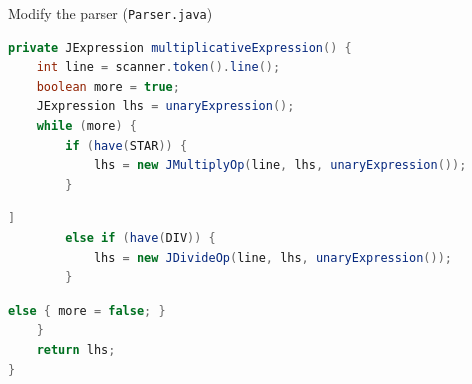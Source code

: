 \documentclass[8pt,a4paper,compress]{beamer}
\begin{document}
\begin{frame}[fragile]
\pause\bigskip

Modify the parser (\lstinline{Parser.java})

\begin{tcolorbox}[enhanced,drop shadow southwest,sharp corners,size=fbox,colback=white,fontlower=\small\ttfamily,collower=silver900]
\begin{lstlisting}[language=Java,style=focusin]
private JExpression multiplicativeExpression() {
    int line = scanner.token().line();
    boolean more = true;
    JExpression lhs = unaryExpression();
    while (more) {
        if (have(STAR)) {
            lhs = new JMultiplyOp(line, lhs, unaryExpression());
        }
\end{lstlisting}
\begin{lstlisting}[language=Java,style=focusin,backgroundcolor=\color{lime100}]]
        else if (have(DIV)) {
            lhs = new JDivideOp(line, lhs, unaryExpression());
        }
\end{lstlisting}
\begin{lstlisting}[language=Java,style=focusin]
        else { more = false; }
    }
    return lhs;
}
\end{lstlisting}
\end{tcolorbox}
\end{frame}
\end{document}
